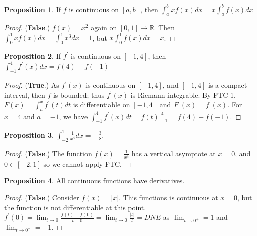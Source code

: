 \documentclass[oneside]{amsart}
\theoremstyle{definition}
\newtheorem{prop}{Proposition}[section]
\newcommand{\rr}{\mathbb R}
\newcommand{\pp}{\prime}
\begin{document}
\begin{prop}
If $f$ is continuous on $[a,b]$, then $\int_a^b x f(x) dx =x \int_a^b f(x) dx$	
\end{prop}
\begin{proof}(\textbf{False}.) $f (x)= x^2$ again on $[0,1] \to \rr$. Then $ \int_0^1 x f(x)dx = \int_0^1 x^3 dx = 1$, but $x \int_0^1 f(x) dx = x$.
\end{proof}

\begin{prop}
If $f^\pp$ is continuous on $[-1,4]$, then $\int_{-1}^4 f^\pp (x) dx = f(4) -f(-1)$
\end{prop}
\begin{proof}(\textbf{True}.) As $f^\pp (x)$ is continuous on $[-1,4]$, and $[-1,4]$ is a compact interval, then $f$ is bounded; thus $f^\pp (x)$ is Riemann integrable. By FTC 1, $F(x) = \int_a^x f^\pp (t) dt$ is differentiable  on $[-1,4]$ and $F^\pp (x) = f^\pp (x)$. For $x=4$ and $a=-1$, we have $\int_{-1}^4 f^\pp(x) dt = f (t)|_{-1}^4 = f(4) - f(-1)$.
	
\end{proof}

\begin{prop}
$\int_{-2}^1 \frac{1}{x^4}dx = -\frac{3}{8}$.	
\end{prop}
\begin{proof} (\textbf{False}.) The function $f(x) = \frac{1}{x^4}$ has a vertical asymptote at $x = 0$, and $0 \in [-2,1]$ so we cannot apply FTC.
\end{proof}

\begin{prop}
All continuous functions have derivatives. 	
\end{prop}
\begin{proof} (\textbf{False}.) Consider $f(x) = |x|$. This functions is continuous at $x = 0$, but the function is not differentiable at this point. $f^\pp (0) = \lim _{t\to 0} \frac{f(t)-f(0)}{t-0} = \lim _{t \to 0} \frac{|t|}{t} = DNE$ as $\lim_{t \to 0^+} = 1$ and$\lim_{t \to 0^-} = -1$.
\end{proof}
\end{document}
